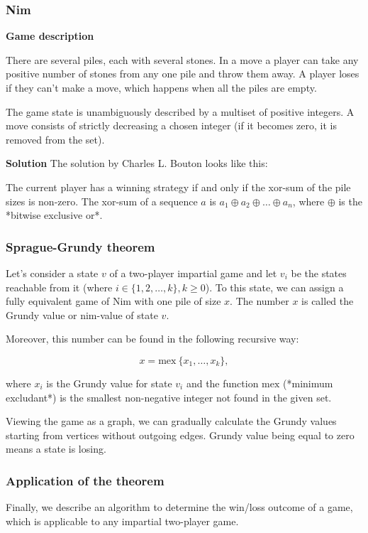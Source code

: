 \subsubsection{Nim}
\textbf{Game description}

There are several piles, each with several stones.
In a move a player can take any positive number of stones from any one pile and throw them away.
A player loses if they can't make a move, which happens when all the piles are empty.

The game state is unambiguously described by a multiset of positive integers.
A move consists of strictly decreasing a chosen integer (if it becomes zero, it is removed from the set).


\textbf{Solution}
The solution by Charles L. Bouton looks like this:

The current player has a winning strategy if and only if the xor-sum of the pile sizes is non-zero.
The xor-sum of a sequence $a$ is $a_1 \oplus a_2 \oplus \ldots \oplus  a_n$, where $\oplus$ is the *bitwise exclusive or*.

\subsubsection{Sprague-Grundy theorem}
Let's consider a state $v$ of a two-player impartial game and let $v_i$ be the states reachable from it (where $i \in \{ 1, 2, \dots, k \} , k \ge 0$).
To this state, we can assign a fully equivalent game of Nim with one pile of size $x$.
The number $x$ is called the Grundy value or nim-value of state $v$.

Moreover, this number can be found in the following recursive way:

$$ x = \text{mex}\ \{ x_1, \ldots, x_k \}, $$

where $x_i$ is the Grundy value for state $v_i$ and the function $\text{mex}$ (*minimum excludant*) is the smallest non-negative integer not found in the given set.

Viewing the game as a graph, we can gradually calculate the Grundy values starting from vertices without outgoing edges.
Grundy value being equal to zero means a state is losing.

\subsubsection{Application of the theorem}
Finally, we describe an algorithm to determine the win/loss outcome of a game, which is applicable to any impartial two-player game.

